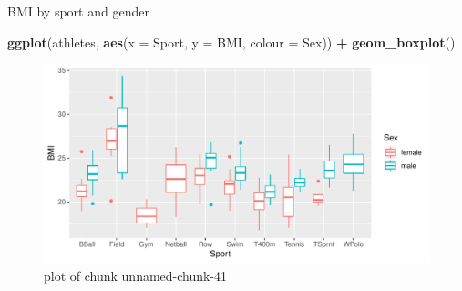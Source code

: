 \documentclass[ignorenonframetext,]{beamer}
\newenvironment{Shaded}{\begin{snugshade}}{\end{snugshade}}
\newcommand{\DataTypeTok}[1]{\textcolor[rgb]{0.13,0.29,0.53}{#1}}
\newcommand{\KeywordTok}[1]{\textcolor[rgb]{0.13,0.29,0.53}{\textbf{#1}}}
\newcommand{\NormalTok}[1]{#1}
\newcommand{\OperatorTok}[1]{\textcolor[rgb]{0.81,0.36,0.00}{\textbf{#1}}}
\newcommand{\StringTok}[1]{\textcolor[rgb]{0.31,0.60,0.02}{#1}}
\begin{document}
\begin{frame}[fragile]{BMI by sport and gender}
\protect\hypertarget{bmi-by-sport-and-gender}{}

\begin{Shaded}
\begin{Highlighting}[]
\KeywordTok{ggplot}\NormalTok{(athletes, }\KeywordTok{aes}\NormalTok{(}\DataTypeTok{x =}\NormalTok{ Sport, }\DataTypeTok{y =}\NormalTok{ BMI, }\DataTypeTok{colour =}\NormalTok{ Sex)) }\OperatorTok{+}
\StringTok{  }\KeywordTok{geom_boxplot}\NormalTok{()}
\end{Highlighting}
\end{Shaded}

\begin{figure}
\centering
\includegraphics{figure/unnamed-chunk-41-1.pdf}
\caption{plot of chunk unnamed-chunk-41}
\end{figure}

\end{frame}
\end{document}
